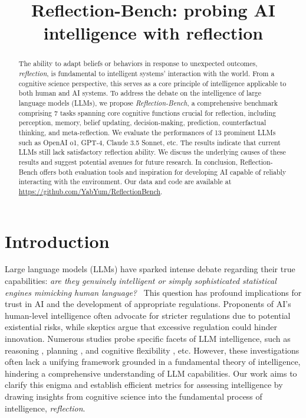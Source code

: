 \title{Reflection-Bench: probing AI intelligence with reflection}



\maketitle
\begin{abstract}
The ability to adapt beliefs or behaviors in response to unexpected outcomes, \textit{reflection}, is fundamental to intelligent systems' interaction with the world. From a cognitive science perspective, this serves as a core principle of intelligence applicable to both human and AI systems. To address the debate on the intelligence of large language models (LLMs), we propose \emph{Reflection-Bench}, a comprehensive benchmark comprising 7 tasks spanning core cognitive functions crucial for reflection, including perception, memory, belief updating, decision-making, prediction, counterfactual thinking, and meta-reflection. We evaluate the performances of 13 prominent LLMs such as OpenAI o1, GPT-4, Claude 3.5 Sonnet, etc. The results indicate that current LLMs still lack satisfactory reflection ability. We discuss the underlying causes of these results and suggest potential avenues for future research.  In conclusion, Reflection-Bench offers both evaluation tools and inspiration for developing AI capable of reliably interacting with the environment. Our data and code are available at \url{https://github.com/YabYum/ReflectionBench}.
\end{abstract}

\section{Introduction}
Large language models (LLMs) have sparked intense debate regarding their true capabilities: \emph{are they genuinely intelligent or simply sophisticated statistical engines mimicking human language?}~\cite{bender2021dangers} This question has profound implications for trust in AI and the development of appropriate regulations. Proponents of AI's human-level intelligence often advocate for stricter regulations due to potential existential risks, while skeptics argue that excessive regulation could hinder innovation. Numerous studies probe specific facets of LLM intelligence, such as reasoning \cite{clark2018think}, planning \cite{valmeekam2024planbench}, and cognitive flexibility \cite{kennedy2024cognitive}, etc. However, these investigations often lack a unifying framework grounded in a fundamental theory of intelligence, hindering a comprehensive understanding of LLM capabilities. Our work aims to clarify this enigma and establish efficient metrics for assessing intelligence by drawing insights from cognitive science into the fundamental process of intelligence, \textit{reflection}.

